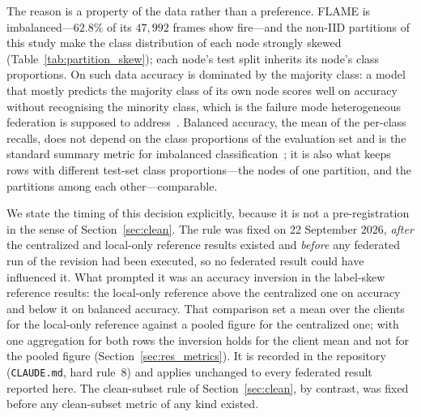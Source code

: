 \documentclass[journal]{IEEEtran}
\begin{document}
The reason is a property of the data rather than a preference. FLAME is imbalanced---$62.8$\% of its $47{,}992$ frames show fire---and the non-IID partitions of this study make the class distribution of each node strongly skewed (Table~\ref{tab:partition_skew}); each node's test split inherits its node's class proportions. On such data accuracy is dominated by the majority class: a model that mostly predicts the majority class of its own node scores well on accuracy without recognising the minority class, which is the failure mode heterogeneous federation is supposed to address~\cite{chicco2020mcc}. Balanced accuracy, the mean of the per-class recalls, does not depend on the class proportions of the evaluation set and is the standard summary metric for imbalanced classification~\cite{brodersen2010balanced}; it is also what keeps rows with different test-set class proportions---the nodes of one partition, and the partitions among each other---comparable.

We state the timing of this decision explicitly, because it is not a pre-registration in the sense of Section~\ref{sec:clean}. The rule was fixed on 22 September 2026, \emph{after} the centralized and local-only reference results existed and \emph{before} any federated run of the revision had been executed, so no federated result could have influenced it. What prompted it was an accuracy inversion in the label-skew reference results: the local-only reference above the centralized one on accuracy and below it on balanced accuracy. That comparison set a mean over the clients for the local-only reference against a pooled figure for the centralized one; with one aggregation for both rows the inversion holds for the client mean and not for the pooled figure (Section~\ref{sec:res_metrics}). It is recorded in the repository (\texttt{CLAUDE.md}, hard rule~8) and applies unchanged to every federated result reported here. The clean-subset rule of Section~\ref{sec:clean}, by contrast, was fixed before any clean-subset metric of any kind existed.
\end{document}
